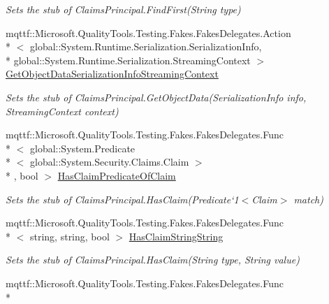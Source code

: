 \begin{DoxyCompactItemize}
\begin{DoxyCompactList}\small\item\em Sets the stub of Claims\-Principal.\-Find\-First(\-String type)\end{DoxyCompactList}\item 
mqttf\-::\-Microsoft.\-Quality\-Tools.\-Testing.\-Fakes.\-Fakes\-Delegates.\-Action\\*
$<$ global\-::\-System.\-Runtime.\-Serialization.\-Serialization\-Info, \\*
global\-::\-System.\-Runtime.\-Serialization.\-Streaming\-Context $>$ \hyperlink{class_system_1_1_security_1_1_claims_1_1_fakes_1_1_stub_claims_principal_ada7636c042836ac37f097d275258de71}{Get\-Object\-Data\-Serialization\-Info\-Streaming\-Context}
\begin{DoxyCompactList}\small\item\em Sets the stub of Claims\-Principal.\-Get\-Object\-Data(\-Serialization\-Info info, Streaming\-Context context)\end{DoxyCompactList}\item 
mqttf\-::\-Microsoft.\-Quality\-Tools.\-Testing.\-Fakes.\-Fakes\-Delegates.\-Func\\*
$<$ global\-::\-System.\-Predicate\\*
$<$ global\-::\-System.\-Security.\-Claims.\-Claim $>$\\*
, bool $>$ \hyperlink{class_system_1_1_security_1_1_claims_1_1_fakes_1_1_stub_claims_principal_ac4ac77b1f05282f215f37dfe2fdc1d08}{Has\-Claim\-Predicate\-Of\-Claim}
\begin{DoxyCompactList}\small\item\em Sets the stub of Claims\-Principal.\-Has\-Claim(Predicate`1$<$Claim$>$ match)\end{DoxyCompactList}\item 
mqttf\-::\-Microsoft.\-Quality\-Tools.\-Testing.\-Fakes.\-Fakes\-Delegates.\-Func\\*
$<$ string, string, bool $>$ \hyperlink{class_system_1_1_security_1_1_claims_1_1_fakes_1_1_stub_claims_principal_a8f0c913f0e7e48962d0e7b29253547a0}{Has\-Claim\-String\-String}
\begin{DoxyCompactList}\small\item\em Sets the stub of Claims\-Principal.\-Has\-Claim(\-String type, String value)\end{DoxyCompactList}\item 
mqttf\-::\-Microsoft.\-Quality\-Tools.\-Testing.\-Fakes.\-Fakes\-Delegates.\-Func\\*

\end{DoxyCompactItemize}
